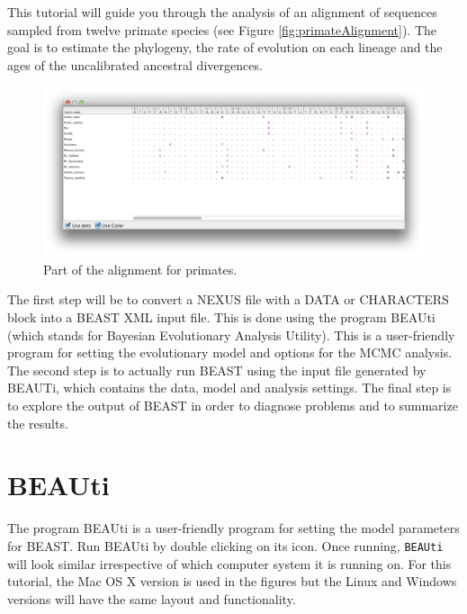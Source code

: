 \documentclass[11pt]{article}
\newcommand{\TODO}[1]{}
\theoremstyle{plain}%
\theoremstyle{definition}
\theoremstyle{remark}
\begin{document}
This tutorial will guide you through the analysis of an alignment of sequences sampled from twelve primate species (see Figure \ref{fig:primateAlignment}). The goal is to estimate the phylogeny, the rate of evolution on each lineage and the ages of the uncalibrated
ancestral divergences. 

\begin{figure}	

\includegraphics[width=\textwidth]{figures/AlignmentViewer.png}

\caption{Part of the alignment for primates.\label{fig:primateAlignment}}
\label{fig:BEAUti_ImportNexus}
\end{figure}

The first step will be to convert a NEXUS file with a DATA or CHARACTERS block into a BEAST XML input file. This is done using the program BEAUti (which stands for Bayesian Evolutionary Analysis Utility). 
This is a user-friendly program for setting the evolutionary model and options for the MCMC analysis. 
The second step is to actually run BEAST using the input file generated by BEAUTi,  which
contains the data, model and analysis settings. 
The final step is to explore the output of BEAST in order to diagnose problems and to summarize the results.

\section{BEAUti}

The program BEAUti is a user-friendly program for setting the
model parameters for BEAST. Run BEAUti by double clicking on its icon. Once running, \texttt{BEAUti} will look similar irrespective
of which computer system it is running on. For this tutorial, the Mac OS X version is used in the figures but
the Linux and Windows versions will have the same layout and functionality.

\TODO{Provide instructions for executing BEAUti  in a Linux environment.}
\end{document}
